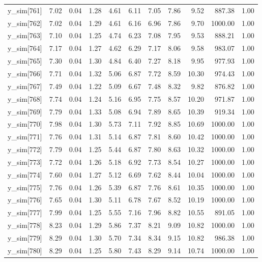 \begin{table}[ht]
\begin{tabular}{rrrrrrrrrrr}
  y\_sim[761] & 7.02 & 0.04 & 1.28 & 4.61 & 6.11 & 7.05 & 7.86 & 9.52 & 887.38 & 1.00 \\ 
  y\_sim[762] & 7.02 & 0.04 & 1.29 & 4.61 & 6.16 & 6.96 & 7.86 & 9.70 & 1000.00 & 1.00 \\ 
  y\_sim[763] & 7.10 & 0.04 & 1.25 & 4.74 & 6.23 & 7.08 & 7.95 & 9.53 & 888.21 & 1.00 \\ 
  y\_sim[764] & 7.17 & 0.04 & 1.27 & 4.62 & 6.29 & 7.17 & 8.06 & 9.58 & 983.07 & 1.00 \\ 
  y\_sim[765] & 7.30 & 0.04 & 1.30 & 4.84 & 6.40 & 7.27 & 8.18 & 9.95 & 977.93 & 1.00 \\ 
  y\_sim[766] & 7.71 & 0.04 & 1.32 & 5.06 & 6.87 & 7.72 & 8.59 & 10.30 & 974.43 & 1.00 \\ 
  y\_sim[767] & 7.49 & 0.04 & 1.22 & 5.09 & 6.67 & 7.48 & 8.32 & 9.82 & 876.82 & 1.00 \\ 
  y\_sim[768] & 7.74 & 0.04 & 1.24 & 5.16 & 6.95 & 7.75 & 8.57 & 10.20 & 971.87 & 1.00 \\ 
  y\_sim[769] & 7.79 & 0.04 & 1.33 & 5.08 & 6.94 & 7.89 & 8.65 & 10.39 & 919.34 & 1.00 \\ 
  y\_sim[770] & 7.98 & 0.04 & 1.30 & 5.73 & 7.11 & 7.92 & 8.85 & 10.69 & 1000.00 & 1.00 \\ 
  y\_sim[771] & 7.76 & 0.04 & 1.31 & 5.14 & 6.87 & 7.81 & 8.60 & 10.42 & 1000.00 & 1.00 \\ 
  y\_sim[772] & 7.79 & 0.04 & 1.25 & 5.44 & 6.87 & 7.80 & 8.63 & 10.32 & 1000.00 & 1.00 \\ 
  y\_sim[773] & 7.72 & 0.04 & 1.26 & 5.18 & 6.92 & 7.73 & 8.54 & 10.27 & 1000.00 & 1.00 \\ 
  y\_sim[774] & 7.60 & 0.04 & 1.27 & 5.12 & 6.69 & 7.62 & 8.44 & 10.04 & 1000.00 & 1.00 \\ 
  y\_sim[775] & 7.76 & 0.04 & 1.26 & 5.39 & 6.87 & 7.76 & 8.61 & 10.35 & 1000.00 & 1.00 \\ 
  y\_sim[776] & 7.65 & 0.04 & 1.30 & 5.11 & 6.78 & 7.67 & 8.52 & 10.19 & 1000.00 & 1.00 \\ 
  y\_sim[777] & 7.99 & 0.04 & 1.25 & 5.55 & 7.16 & 7.96 & 8.82 & 10.55 & 891.05 & 1.00 \\ 
  y\_sim[778] & 8.23 & 0.04 & 1.29 & 5.86 & 7.37 & 8.21 & 9.09 & 10.82 & 1000.00 & 1.00 \\ 
  y\_sim[779] & 8.29 & 0.04 & 1.30 & 5.70 & 7.34 & 8.34 & 9.15 & 10.82 & 986.38 & 1.00 \\ 
  y\_sim[780] & 8.29 & 0.04 & 1.25 & 5.80 & 7.43 & 8.29 & 9.14 & 10.74 & 1000.00 & 1.00 \\ 

\end{tabular}
\end{table}
